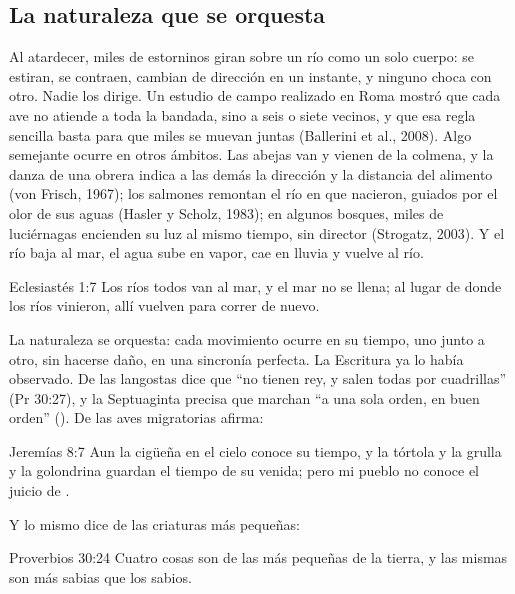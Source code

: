 \subsection{La naturaleza que se orquesta}

Al atardecer, miles de estorninos giran sobre un río como un solo cuerpo: se estiran, se contraen, cambian de dirección en un instante, y ninguno choca con otro. Nadie los dirige. Un estudio de campo realizado en Roma mostró que cada ave no atiende a toda la bandada, sino a seis o siete vecinos, y que esa regla sencilla basta para que miles se muevan juntas (Ballerini et al., 2008). Algo semejante ocurre en otros ámbitos. Las abejas van y vienen de la colmena, y la danza de una obrera indica a las demás la dirección y la distancia del alimento (von Frisch, 1967); los salmones remontan el río en que nacieron, guiados por el olor de sus aguas (Hasler y Scholz, 1983); en algunos bosques, miles de luciérnagas encienden su luz al mismo tiempo, sin director (Strogatz, 2003). Y el río baja al mar, el agua sube en vapor, cae en lluvia y vuelve al río.

\begin{verso}{Eclesiastés 1:7}
Los ríos todos van al mar, y el mar no se llena; al lugar de donde los ríos vinieron, allí vuelven para correr de nuevo.
\end{verso}

La naturaleza se orquesta: cada movimiento ocurre en su tiempo, uno junto a otro, sin hacerse daño, en una sincronía perfecta. La Escritura ya lo había observado. De las langostas dice que ``no tienen rey, y salen todas por cuadrillas'' (Pr 30:27), y la Septuaginta precisa que marchan ``a una sola orden, en buen orden'' (). De las aves migratorias afirma:

\begin{verso}{Jeremías 8:7}
Aun la cigüeña en el cielo conoce su tiempo, y la tórtola y la grulla y la golondrina guardan el tiempo de su venida; pero mi pueblo no conoce el juicio de \SENOR.
\end{verso}

Y lo mismo dice de las criaturas más pequeñas:

\begin{verso}{Proverbios 30:24}
Cuatro cosas son de las más pequeñas de la tierra, y las mismas son más sabias que los sabios.
\end{verso}

